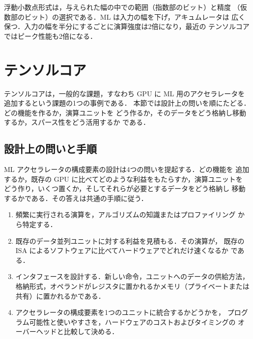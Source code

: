\documentclass[../main.tex]{subfiles}
\begin{document}
\begin{keypoint}
  浮動小数点形式は，与えられた幅の中での範囲（指数部のビット）と精度
  （仮数部のビット）の選択である．ML は入力の幅を下げ，アキュムレータは
  広く保つ．入力の幅を半分にするごとに演算強度は2倍になり，最近の
  テンソルコアではピーク性能も2倍になる．
\end{keypoint}

\section{テンソルコア}
\label{sec:l12-tensor-core}

テンソルコアは，一般的な課題，すなわち GPU に ML 用のアクセラレータを
追加するという課題の1つの事例である．
本節では設計上の問いを順にたどる．どの機能を作るか，演算ユニットを
どう作るか，そのデータをどう格納し移動するか，スパース性をどう活用するか
である．

\subsection{設計上の問いと手順}

ML アクセラレータの構成要素の設計は4つの問いを提起する．どの機能を
追加するか，既存の GPU に比べてどのような利益をもたらすか，演算ユニットを
どう作り，いくつ置くか，そしてそれらが必要とするデータをどう格納し
移動するかである．その答えは共通の手順に従う．
\begin{enumerate}
  \item 頻繁に実行される演算を，アルゴリズムの知識またはプロファイリング
    から特定する．
  \item 既存のデータ並列ユニットに対する利益を見積もる．その演算が，
    既存の ISA によるソフトウェアに比べてハードウェアでどれだけ速くなるか
    である．
  \item インタフェースを設計する．新しい命令，ユニットへのデータの供給方法，
    格納形式，オペランドがレジスタに置かれるかメモリ（プライベートまたは
    共有）に置かれるかである．
  \item アクセラレータの構成要素を1つのユニットに統合するかどうかを，
    プログラム可能性と使いやすさを，ハードウェアのコストおよびタイミングの
    オーバーヘッドと比較して決める．
\end{enumerate}
\end{document}

